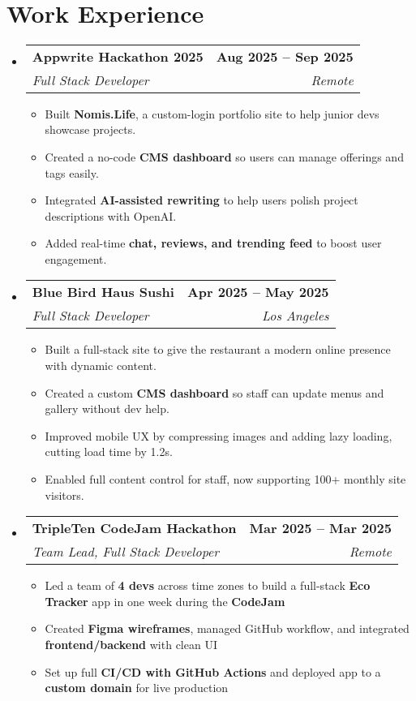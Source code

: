 \documentclass[letterpaper,11pt]{article}
\makeatletter
\newcommand{\resumeItem}[1]{
  \item\small{
    {#1 \vspace{0pt}}
  }
}
\newcommand{\resumeSubheading}[4]{
  \vspace{-2pt}\item
    \begin{tabular*}{1.0\textwidth}[t]{l@{\extracolsep{\fill}}r}
      \textbf{#1} & \textbf{\small #2} \\
      \textit{\small#3} & \textit{\small #4} \\
    \end{tabular*}\vspace{-7pt}
}
\newcommand{\resumeSubHeadingListStart}{\begin{itemize}[leftmargin=0.0in, label={}]}
\newcommand{\resumeSubHeadingListEnd}{\end{itemize}}\vspace{0pt}
\newcommand{\resumeItemListStart}{\begin{itemize}}
\newcommand{\resumeItemListEnd}{\end{itemize}\vspace{-5pt}}
\makeatother
\begin{document}
 \vspace{-16pt}
 \vspace{3pt}
\vspace{10pt}

\vspace{-12pt}
\
\section{Work Experience}
\resumeSubHeadingListStart

\resumeSubheading
  {Appwrite Hackathon 2025}{Aug 2025 -- Sep 2025}
  {Full Stack Developer}{Remote}
\resumeItemListStart
  \resumeItem{Built \textbf{Nomis.Life}, a custom-login portfolio site to help junior devs showcase projects.}
  \resumeItem{Created a no-code \textbf{CMS dashboard} so users can manage offerings and tags easily.}
  \resumeItem{Integrated \textbf{AI-assisted rewriting} to help users polish project descriptions with OpenAI.}
  \resumeItem{Added real-time \textbf{chat, reviews, and trending feed} to boost user engagement.}
\resumeItemListEnd



\resumeSubheading
  {Blue Bird Haus Sushi}{Apr 2025 -- May 2025}
  {Full Stack Developer}{Los Angeles}
\resumeItemListStart
  \resumeItem{Built a full-stack site to give the restaurant a modern online presence with dynamic content.}
  \resumeItem{Created a custom \textbf{CMS dashboard} so staff can update menus and gallery without dev help.}
  \resumeItem{Improved mobile UX by compressing images and adding lazy loading, cutting load time by 1.2s.}
  \resumeItem{Enabled full content control for staff, now supporting 100+ monthly site visitors.}
\resumeItemListEnd




            \resumeSubheading{TripleTen CodeJam Hackathon}{Mar 2025 -- Mar 2025}{Team Lead, Full Stack Developer}{Remote}
            \resumeItemListStart
              \resumeItem{Led a team of \textbf{4 devs} across time zones to build a full-stack \textbf{Eco Tracker} app in one week during the \textbf{CodeJam}}
              \resumeItem{Created \textbf{Figma wireframes}, managed GitHub workflow, and integrated \textbf{frontend/backend} with clean UI}
              \resumeItem{Set up full \textbf{CI/CD with GitHub Actions} and deployed app to a \textbf{custom domain} for live production}
\resumeItemListEnd
    \resumeSubHeadingListEnd
    
    \vspace{-12pt}
\end{document}
